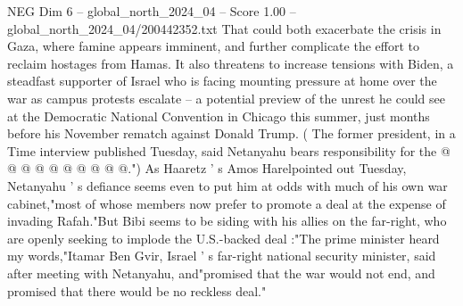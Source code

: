 \begin{textsample}{NEG Dim 6 – global\_north\_2024\_04 – Score 1.00 – global\_north\_2024\_04/200442352.txt}
That could both exacerbate the crisis in Gaza, where famine appears imminent, and further complicate the effort to reclaim hostages from Hamas.
It also threatens to increase tensions with Biden, a steadfast supporter of Israel who is facing mounting pressure at home over the war as campus protests escalate -- a potential preview of the unrest he could see at the Democratic National Convention in Chicago this summer, just months before his November rematch against Donald Trump. ( The former president, in a Time interview published Tuesday, said Netanyahu bears responsibility for the @ @ @ @ @ @ @ @ @ @.") As Haaretz ' s Amos Harelpointed out Tuesday, Netanyahu ' s defiance seems even to put him at odds with much of his own war cabinet,"most of whose members now prefer to promote a deal at the expense of invading Rafah."But Bibi seems to be siding with his allies on the far-right, who are openly seeking to implode the U.S.-backed deal :"The prime minister heard my words,"Itamar Ben Gvir, Israel ' s far-right national security minister, said after meeting with Netanyahu, and"promised that the war would not end, and promised that there would be no reckless deal."

\end{textsample}
